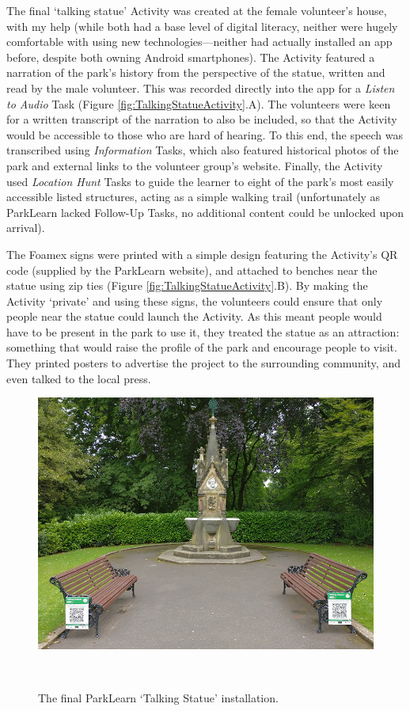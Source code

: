 The final `talking statue' Activity was created at the female volunteer's house, with my help (while both had a base level of digital literacy, neither were hugely comfortable with using new technologies---neither had actually installed an app before, despite both owning Android smartphones). The Activity featured a narration of the park's history from the perspective of the statue, written and read by the male volunteer. This was recorded directly into the app for a \textit{Listen to Audio} Task (Figure \ref{fig:TalkingStatueActivity}.A). The volunteers were keen for a written transcript of the narration to also be included, so that the Activity would be accessible to those who are hard of hearing. To this end, the speech was transcribed using \textit{Information} Tasks, which also featured historical photos of the park and external links to the volunteer group's website. Finally, the Activity used \textit{Location Hunt} Tasks to guide the learner to eight of the park's most easily accessible listed structures, acting as a simple walking trail (unfortunately as ParkLearn lacked Follow-Up Tasks, no additional content could be unlocked upon arrival).

The Foamex signs were printed with a simple design featuring the Activity's QR code (supplied by the ParkLearn website), and attached to benches near the statue using zip ties (Figure \ref{fig:TalkingStatueActivity}.B). By making the Activity ‘private’ and using these signs, the volunteers could ensure that only people near the statue could launch the Activity. As this meant people would have to be present in the park to use it, they treated the statue as an attraction: something that would raise the profile of the park and encourage people to visit. They printed posters to advertise the project to the surrounding community, and even talked to the local press. 

\begin{figure}
  \centering
  \includegraphics[width=0.85\columnwidth]{images/chapter06/TalkingStatue.jpg}
  \caption[The ParkLearn `Talking Statue' installation]{The final ParkLearn `Talking Statue' installation.}~\label{fig:TalkingStatue}
\end{figure}

